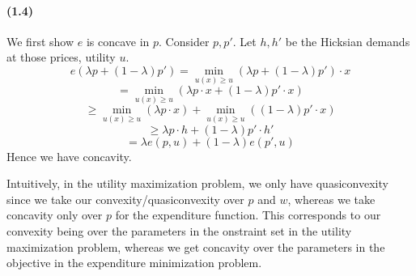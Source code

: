 \documentclass[10pt,letter]{article}
\begin{document}
\paragraph{(1.4)}
We first show $e$ is concave in $p$. Consider $p, p'$. Let $h, h'$ be the Hicksian demands at those prices, utility $u$.
\[ e(\lambda p + (1-\lambda) p') = \min_{u(x) \ge u} (\lambda p + (1-\lambda)p')\cdot x \]
\[ = \min_{u(x) \ge u} (\lambda p\cdot x + (1-\lambda)p'\cdot x) \]
\[ \ge \min_{u(x) \ge u} (\lambda p\cdot x) + \min_{u(x) \ge u}((1-\lambda)p'\cdot x) \]
\[ \ge \lambda p\cdot h + (1-\lambda)p'\cdot h' \]
\[ = \lambda e(p, u) + (1-\lambda)e(p', u) \]
Hence we have concavity.

Intuitively, in the utility maximization problem, we only have quasiconvexity since we take our convexity/quasiconvexity over $p$ and $w$, whereas we take concavity only over $p$ for the expenditure function. This corresponds to our convexity being over the parameters in the onstraint set in the utility maximization problem, whereas we get concavity over the parameters in the objective in the expenditure minimization problem.
\end{document}
